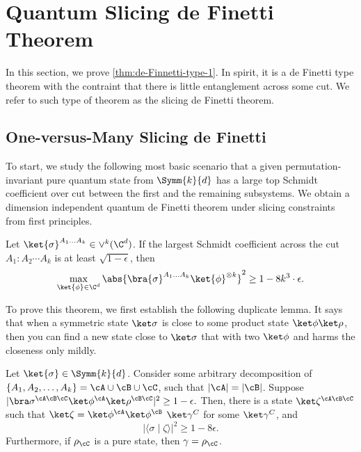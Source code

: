 \section{Quantum Slicing de Finetti Theorem}\label{sec:de_finetti}

In this section, we prove \cref{thm:de-Finnetti-type-1}. In spirit, it is a de Finetti type theorem with the contraint that there is little entanglement across some cut. We refer to such type of theorem as the slicing de Finetti theorem.


\subsection{One-versus-Many Slicing de Finetti}
To start, we study the following most basic scenario that a given permutation-invariant pure quantum state from $\Symm{k}{d}$ has a large top Schmidt coefficient over cut between the first and the remaining subsystems. We obtain a dimension independent quantum de Finetti theorem under slicing constraints from first principles.


\begin{theorem}\label{thm:one_vs_many}
Let $\ket{\sigma}^{A_1\ldots A_k} \in \vee^k(\C^d)$. If the largest Schmidt coefficient across
the cut $A_1:A_2\cdots A_k$ is at least $\sqrt{1-\epsilon}$, then
  \begin{align*}
    \max_{\ket{\phi} \in \C^d} \abs{\bra{\sigma}^{A_1\ldots A_k} \ket{\phi}^{\otimes k} }^2  \ge 1 - 8k^3\cdot \epsilon.
  \end{align*}
\end{theorem}



To prove this theorem, we first establish the following duplicate lemma. It says that when a symmetric state $\ket\sigma$ is close to some product state $\ket\phi\ket\rho$, then you can find a new state close to $\ket\sigma$ that with two $\ket\phi$ and harms the closeness only mildly.
\begin{lemma}\label{lem:dup}
Let $\ket{\sigma}\in \Symm{k}{d}$. 
Consider some arbitrary decomposition of $\{A_1,A_2,\ldots, A_k\}=\cA\cup \cB \cup \cC$,
such that $|\cA|=|\cB|$. Suppose $ |\bra\sigma ^{\cA\cB\cC} \ket\phi^{\cA} \ket\rho^{\cB\cC}|^2 \ge 1-\epsilon. $
Then, there is a state $\ket\zeta^{\cA\cB\cC}$ such that $\ket\zeta=\ket\phi^\cA\ket\phi^\cB$ $\ket\gamma^{C}$ for some $\ket\gamma^C$, and
    \[
        |\langle\sigma\mid \zeta\rangle|^2 \ge 1-8\epsilon.
    \]
Furthermore, if $\rho_\cC$ is a pure state, then $\gamma = \rho_\cC$.
\end{lemma}

